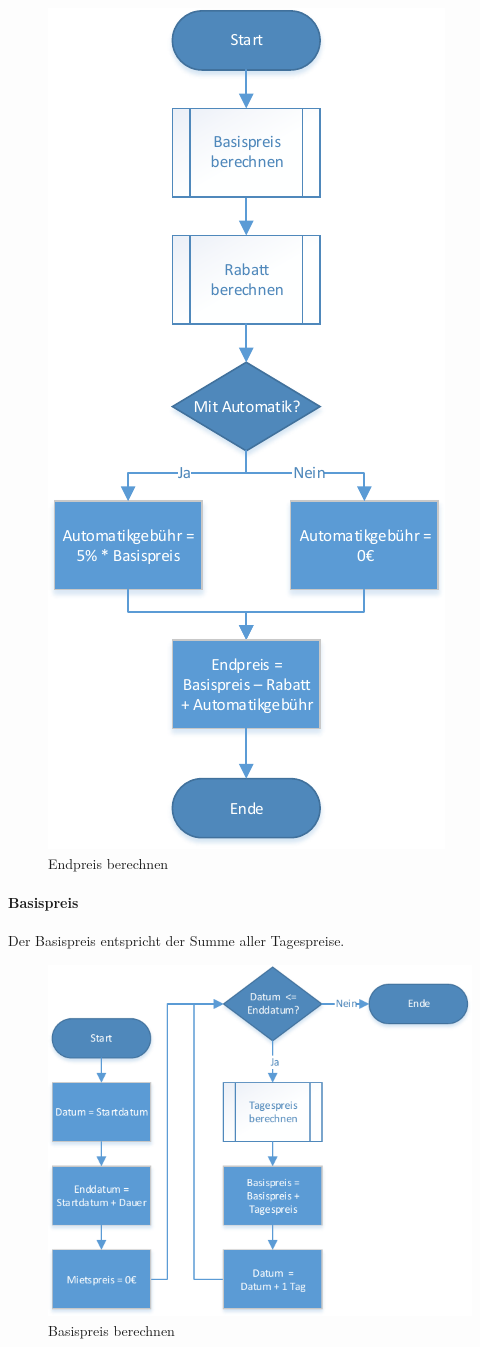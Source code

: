 \begin{figure}[p]
	\centering
	\includegraphics[width=0.6\linewidth]{Bilder/Endpreis_berechnen}
	\caption{Endpreis berechnen}
	\label{fig:Endpreis_berechnen}
\end{figure}

\newpage 
\paragraph{Basispreis}

Der Basispreis entspricht der Summe aller Tagespreise.

\begin{figure}[H]
	\centering
	\includegraphics[width=0.8\linewidth]{Bilder/Basispreis_berechnen}
	\caption{Basispreis berechnen}
	\label{fig:Basispreis_berechnen}
\end{figure}

